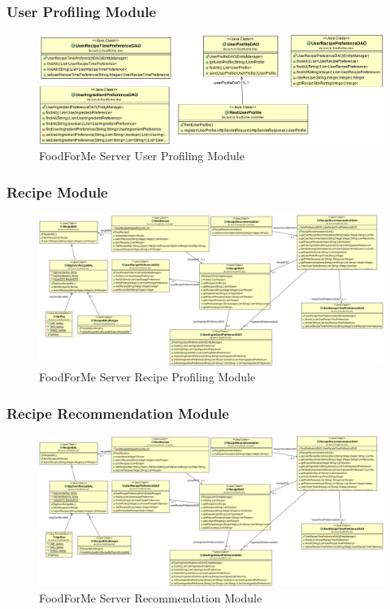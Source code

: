 \subsubsection{User Profiling Module}
\begin{figure}[h]
	\centering
	\includegraphics[width=1\linewidth]{figures/ch4_erd_and_class_dig/ch4_user.png}
	\caption{FoodForMe Server User Profiling Module}
	\label{fig:ch4_user}
\end{figure}

\subsubsection{Recipe Module}
\begin{figure}[h]
	\centering
	\includegraphics[width=1\linewidth]{figures/ch4_erd_and_class_dig/ch4_recipe.png}
	\caption{FoodForMe Server Recipe Profiling Module}
	\label{fig:ch4_recipe}
\end{figure}

\newpage
\subsubsection{Recipe Recommendation Module}
\begin{figure}[h]
	\centering
	\includegraphics[width=1\linewidth]{figures/ch4_erd_and_class_dig/ch4_receipe_recommender.png}
	\caption{FoodForMe Server Recommendation Module}
	\label{fig:ch4_receipe_recommender}
\end{figure}


